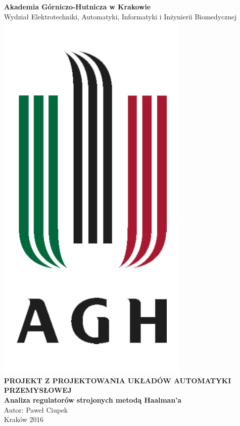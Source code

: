 \documentclass[10pt,a4paper]{article}
\begin{document}
\begin{titlepage}
	\begin{center}
    	\textbf{\Large Akademia Górniczo-Hutnicza w Krakowie} \\
    	\vspace{0.1cm}
    	{\Large Wydział Elektrotechniki, Automatyki, Informatyki i Inżynierii
    	Biomedycznej} \\
    	\vspace{1cm}
        \includegraphics[scale = 0.4]{images/agh-logo.png} \\
        \vspace{1cm}
        \textbf{\Large PROJEKT Z PROJEKTOWANIA UKŁADÓW AUTOMATYKI PRZEMYSŁOWEJ} \\
        \vspace{1cm}
        \textbf{\Large Analiza regulatorów strojonych metodą Haalman'a} \\
        \vspace{2cm}
        {\Large Autor: Paweł Ciupek} \\
        \vfill{\Large Kraków 2016}
	\end{center}
\end{titlepage}
\end{document}
